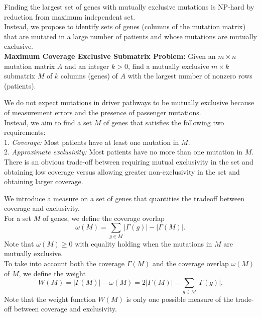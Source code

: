 \documentclass[xcolor=dvipsnames]{beamer}
\begin{document}
\begin{frame}
Finding the largest set of genes with mutually exclusive mutations is NP-hard by reduction from maximum independent set.\\
Instead, we propose to identify sets of genes (columns of the mutation matrix) that are mutated in a large number of patients and whose mutations are mutually exclusive.\\
\textbf{Maximum Coverage Exclusive Submatrix Problem:} Given an $m\times n$ mutation matrix $A$ and an integer $k>0$, find a mutually exclusive $m\times k$ submatrix $M$ of $k$ columns (genes) of $A$ with the largest number of nonzero rows (patients).\\
\end{frame}
\begin{frame}
We do not expect mutations in driver pathways to be mutually exclusive because of measurement errors and the presence of passenger mutations.\\
Instead, we aim to find a set $M$ of genes that satisfies the following two requirements:\\
1. {\em Coverage:} Most patients have at least one mutation in $M$.\\
2. {\em Approximate exclusivity:} Most patients have no more than one mutation in $M$.\\
There is an obvious trade-off between requiring mutual exclusivity in the set and obtaining low coverage versus allowing greater non-exclusivity in the set and obtaining larger coverage.\\
\end{frame}
\begin{frame}
We introduce a measure on a set of genes that quantities the tradeoff between coverage and exclusivity.\\
For a set $M$ of genes, we define the coverage overlap\\
\[
\omega(M)=\sum_{g\in M}|\Gamma(g)|-|\Gamma(M)|.
\]
Note that $\omega(M)\geqslant 0$ with equality holding when the mutations in $M$ are mutually exclusive.\\
To take into account both the coverage $\Gamma(M)$ and the coverage overlap $\omega(M)$ of $M$, we define the weight\\
\[
W(M)=|\Gamma(M)|-\omega(M)=2|\Gamma(M)|-\sum_{g\in M}|\Gamma(g)|.
\]
Note that the weight function $W(M)$ is only one possible measure of the trade-off between coverage and exclusivity.
\end{frame}
\end{document}
